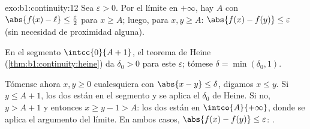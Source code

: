 \begin{solution}{exo:b1:continuity:12}
Sea $\varepsilon > 0$. Por el límite en $+\infty$, hay $A$ con
$\abs{f(x) - \ell} \leq \frac\varepsilon2$ para $x \geq A$; luego,
para $x, y \geq A$: $\abs{f(x) - f(y)} \leq \varepsilon$ (sin
necesidad de proximidad alguna).

En el segmento $\intcc{0}{A + 1}$, el teorema de Heine
(\cref{thm:b1:continuity:heine}) da $\delta_0 > 0$ para este
$\varepsilon$; tómese $\delta = \min(\delta_0, 1)$.

Tómense ahora $x, y \geq 0$ cualesquiera con $\abs{x - y} \leq \delta$,
digamos $x \leq y$. Si $y \leq A + 1$, los dos están en el segmento y
se aplica el $\delta_0$ de Heine. Si no, $y > A + 1$ y entonces
$x \geq y - 1 > A$: los dos están en $\intco{A}{+\infty}$, donde se
aplica el argumento del límite. En ambos casos,
$\abs{f(x) - f(y)} \leq \varepsilon$: .
\end{solution}

